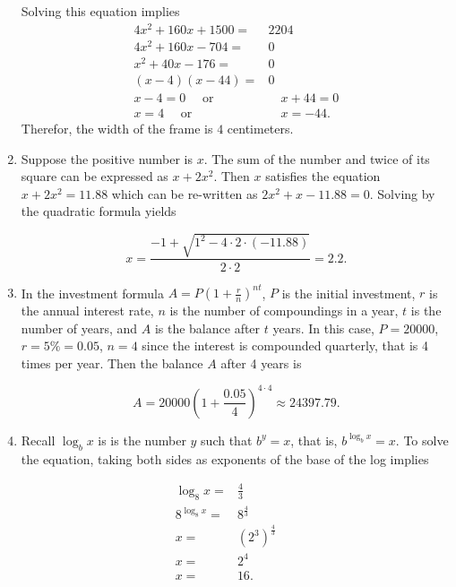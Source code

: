 \documentclass[
  12pt]{article}
\begin{document}
\begin{enumerate}
  Solving this equation implies \[
  \begin{aligned}
  4x^2+160x+1500=&2204\\
  4x^2+160x-704=&0\\
  x^2+40x-176=&0\\
  (x-4)(x-44)=&0\\
  x-4=0\quad\text{ or}&\quad x+44=0\\
  x=4\quad\text{ or}&\quad x=-44.
  \end{aligned}
  \] Therefor, the width of the frame is \(4\) centimeters.
\item
  Suppose the positive number is \(x\). The sum of the number and twice
  of its square can be expressed as \(x+2x^2\). Then \(x\) satisfies the
  equation \(x+2x^2=11.88\) which can be re-written as
  \(2x^2+x-11.88=0\). Solving by the quadratic formula yields

  \[x=\frac{-1+\sqrt{1^2-4\cdot 2\cdot (-11.88)}}{2\cdot 2}=2.2.\]
\item
  In the investment formula \(A=P(1+\frac{r}{n})^{nt}\), \(P\) is the
  initial investment, \(r\) is the annual interest rate, \(n\) is the
  number of compoundings in a year, \(t\) is the number of years, and
  \(A\) is the balance after \(t\) years. In this case, \(P=20000\),
  \(r=5\%=0.05\), \(n=4\) since the interest is compounded quarterly,
  that is 4 times per year. Then the balance \(A\) after 4 years is

  \[A=20000\left(1+\frac{0.05}{4}\right)^{4\cdot 4}\approx 24397.79.\]
\item
  Recall \(\log_bx\) is is the number \(y\) such that \(b^y=x\), that
  is, \(b^{\log_bx}=x\). To solve the equation, taking both sides as
  exponents of the base of the log implies
\end{enumerate}

\[
\begin{aligned}
\log_8x=&\frac43\\
8^{\log_8x}=&8^{\frac43}\\
x=&(2^3)^{\frac43}\\
x=&2^4\\
x=&16.
\end{aligned}
\]
\end{document}
